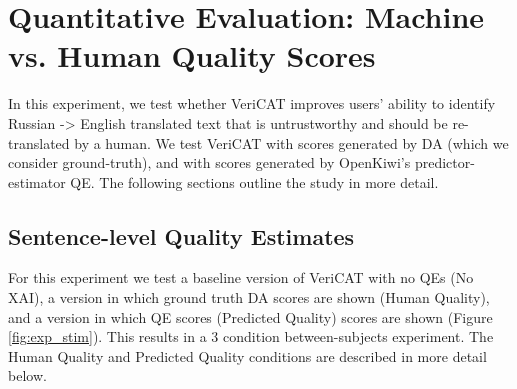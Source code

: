 \section{Quantitative Evaluation: Machine vs. Human Quality Scores} 

In this experiment, we test whether VeriCAT improves users' ability to identify Russian -> English translated text that is untrustworthy and should be re-translated by a human. We test VeriCAT with scores generated by DA (which we consider ground-truth), and with scores generated by OpenKiwi's predictor-estimator QE. The following sections outline the study in more detail. 

\subsection{Sentence-level Quality Estimates}

For this experiment we test a baseline version of VeriCAT with no QEs (No XAI), a version in which ground truth DA scores are shown (Human Quality), and a version in which QE scores (Predicted Quality) scores are shown (Figure \ref{fig:exp_stim}). This results in a 3 condition between-subjects experiment. 
The Human Quality and Predicted Quality conditions are described in more detail below.  

